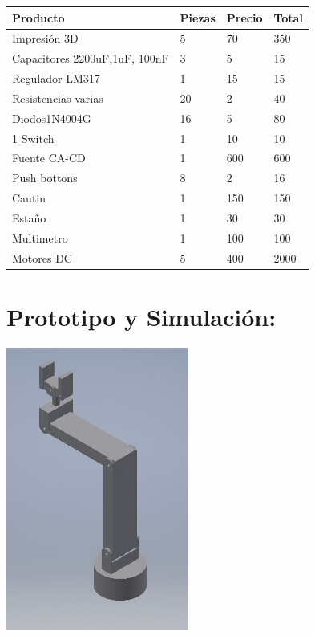 \documentclass[14pt,a4paper]{article}
\begin{document}
\begin{tabular}{|l|l|l|l|}
\hline
	Producto & Piezas & Precio & Total\\
\hline
	Impresión 3D & 5 & 70$  $ & 350\\

\hline
	Capacitores 2200uF,1uF, 100nF & 3 & 5$  $ & 15\\
\hline
	Regulador LM317 & 1 & 15$  $ & 15\\
\hline
	Resistencias varias & 20 & 2$  $ & 40\\
\hline
	Diodos1N4004G & 16 & 5$  $ & 80\\
\hline
	1 Switch & 1 & 10$  $ & 10\\

\hline
	Fuente CA-CD & 1 & 600$  $ & 600\\
\hline
	Push bottons & 8 & 2$  $ & 16\\
\hline
    Cautin & 1 & 150$  $ & 150\\
\hline
	Estaño & 1 & 30$  $ & 30\\
\hline
	Multimetro & 1 & 100$  $ & 100\\
\hline
    Motores DC & 5 & 400$  $ & 2000\\
\hline
\end{tabular}

\section{Prototipo y Simulación:}
\begin{center}
\includegraphics[width=6cm]{Proto.jpeg}
\end{center}
\end{document}
